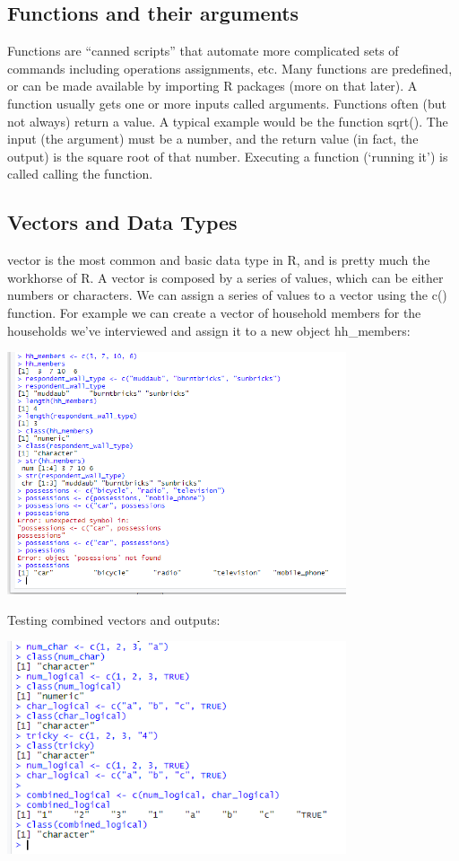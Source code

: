 \documentclass{article}
\begin{document}
\subsection{Functions and their arguments}

Functions are “canned scripts” that automate more complicated sets of commands including operations assignments, etc. Many functions are predefined, or can be made available by importing R packages (more on that later). A function usually gets one or more inputs called arguments. Functions often (but not always) return a value. A typical example would be the function sqrt(). The input (the argument) must be a number, and the return value (in fact, the output) is the square root of that number. Executing a function (‘running it’) is called calling the function.




\subsection{Vectors and Data Types}
 vector is the most common and basic data type in R, and is pretty much the workhorse of R. A vector is composed by a series of values, which can be either numbers or characters. We can assign a series of values to a vector using the c() function. For example we can create a vector of household members for the households we’ve interviewed and assign it to a new object hh\_members:
 
\includegraphics[width=10cm]{Images/RStudio010.PNG}

Testing combined vectors and outputs:

\includegraphics[width=10cm]{Images/RStudio011.PNG}
\end{document}

